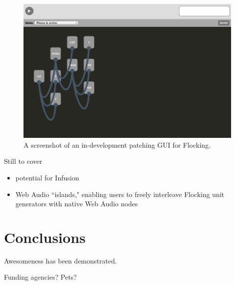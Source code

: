 \documentclass{article}
\begin{document}
\begin{figure}[h]
\centering
\includegraphics[width=0.9\columnwidth]{images/flocking-playground-graphical-view.png}
\caption{ A screenshot of an in-development patching GUI for Flocking.\label{fig:graphical}}
\end{figure}

Still to cover
\begin{itemize}
  \item potential for Infusion
  \item Web Audio ``islands," enabling users to freely interleave Flocking unit generators with native Web Audio nodes
\end{itemize}

\section{Conclusions}
Awesomeness has been demonstrated.

\nocite{*} %

\begin{acknowledgments}
Funding agencies? Pets?
\end{acknowledgments}


\end{document}
